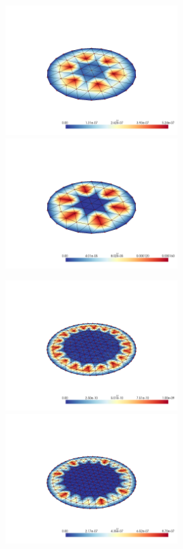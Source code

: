 \documentclass[
  11pt,
]{article}
\let\origfigure\figure
\let\endorigfigure\endfigure
\renewenvironment{figure}[1][2] {
    \expandafter\origfigure\expandafter[H]
} {
    \endorigfigure
}
\begin{document}
\begin{figure}
\caption{Finite element error in the L2 and H1 norms/seminorms, respectively for problem 1 over mesh number 1 using order 13 quadrature.}
\end{figure}

\includegraphics[width=0.5\textwidth,height=\textheight]{../img/mesh1-gauss19-L2.png}
\includegraphics[width=0.5\textwidth,height=\textheight]{../img/mesh1-gauss19-H1.png}

\begin{figure}
\caption{Finite element error in the L2 and H1 norms/seminorms, respectively for problem 1 over mesh number 1 using order 19 quadrature.}
\end{figure}

\includegraphics[width=0.5\textwidth,height=\textheight]{../img/mesh2-gauss02-L2.png}
\includegraphics[width=0.5\textwidth,height=\textheight]{../img/mesh2-gauss02-H1.png}
\end{document}
